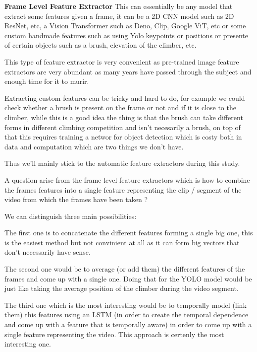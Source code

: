 
\textbf{Frame Level Feature Extractor}
This can essentially be any model that extract some features given a frame, it can be a 2D CNN model such as 2D ResNet, etc, a Vision Transformer such as Deno, Clip, Google ViT, etc or some custom handmade features such as using Yolo keypoints or positions or presente of certain objects such as a brush, elevation of the climber, etc.

This type of feature extractor is very convenient as pre-trained image feature extractors are very abundant as many years have passed through the subject and enough time for it to murir.

Extracting custom features can be tricky and hard to do, for example we could check whether a brush is present on the frame or not and if it is close to the climber, while this is a good idea the thing is that the brush can take different forms in different climbing competition and isn't necesarily a brush, on top of that this requires training a networ for object detection which is costy both in data and computation which are two things we don't have.

Thus we'll mainly stick to the automatic feature extractors during this study.

A question arise from  the frame level feature extractors which is how to combine the frames features into a single feature representing the clip / segment of the video from which the frames have been taken ?

We can distinguish three main possibilities:

The first one is to concatenate the different features forming a single big one, this is the easiest method but not convinient at all as it can form big vectors that don't necessarily have sense.

The second one would be to average (or add them) the different features of the frames and come up with a single one. Doing that for the YOLO model would be just like taking the average position of the climber during the video segment.

The third one which is the most interesting would be to temporally model (link them) this features using an LSTM (in order to create the temporal dependence and come up with a feature that is temporally aware) in order to come up with a single feature representing the video. This approach is certenly the most interesting one.

